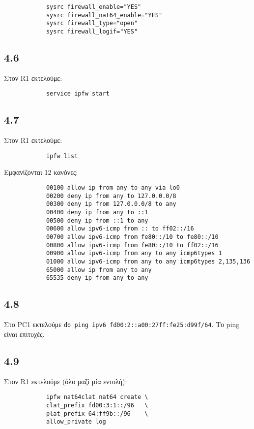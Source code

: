 \documentclass[a4paper, 12pt]{article}
\begin{document}
		\begin{verbatim}
			sysrc firewall_enable="YES"
			sysrc firewall_nat64_enable="YES"
			sysrc firewall_type="open"
			sysrc firewall_logif="YES"
		\end{verbatim}

	\subsection*{4.6}
		Στον R1 εκτελούμε:
		
		\begin{verbatim}
			service ipfw start
		\end{verbatim}

	\subsection*{4.7}
		Στον R1 εκτελούμε:
		
		\begin{verbatim}
			ipfw list
		\end{verbatim}
		
		Εμφανίζονται 12 κανόνες:
		
		\begin{verbatim}
			00100 allow ip from any to any via lo0
			00200 deny ip from any to 127.0.0.0/8
			00300 deny ip from 127.0.0.0/8 to any
			00400 deny ip from any to ::1
			00500 deny ip from ::1 to any
			00600 allow ipv6-icmp from :: to ff02::/16
			00700 allow ipv6-icmp from fe80::/10 to fe80::/10
			00800 allow ipv6-icmp from fe80::/10 to ff02::/16
			00900 allow ipv6-icmp from any to any icmp6types 1
			01000 allow ipv6-icmp from any to any icmp6types 2,135,136
			65000 allow ip from any to any
			65535 deny ip from any to any
		\end{verbatim}

	\subsection*{4.8}
		Στο PC1 εκτελούμε \verb|do ping ipv6 fd00:2::a00:27ff:fe25:d99f/64|. Το ping είναι επιτυχές.
	\subsection*{4.9}
		Στον R1 εκτελούμε (όλο μαζί μία εντολή):
		
		\begin{verbatim}
			ipfw nat64clat nat64 create \
			clat_prefix fd00:3:1::/96   \
			plat_prefix 64:ff9b::/96    \
			allow_private log
		\end{verbatim}
\end{document}
